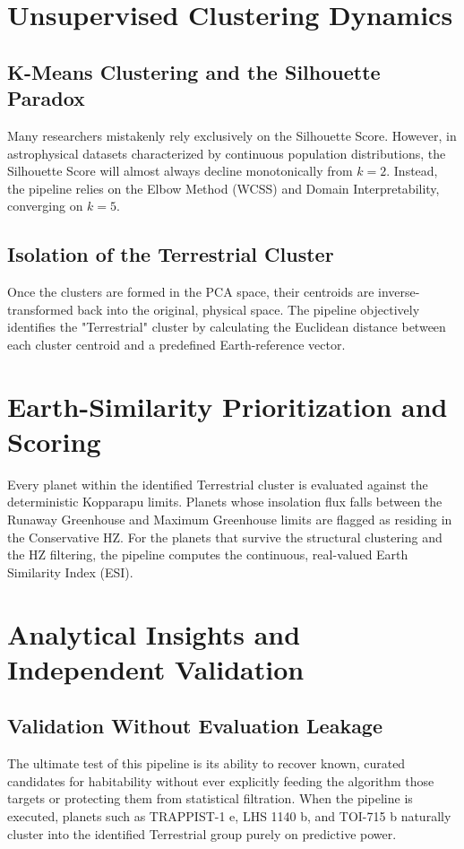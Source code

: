 \section{Unsupervised Clustering Dynamics}
\subsection{K-Means Clustering and the Silhouette Paradox}
Many researchers mistakenly rely exclusively on the Silhouette Score. However, in astrophysical datasets characterized by continuous population distributions, the Silhouette Score will almost always decline monotonically from $k=2$. Instead, the pipeline relies on the Elbow Method (WCSS) and Domain Interpretability, converging on $k=5$.

\subsection{Isolation of the Terrestrial Cluster}
Once the clusters are formed in the PCA space, their centroids are inverse-transformed back into the original, physical space. The pipeline objectively identifies the "Terrestrial" cluster by calculating the Euclidean distance between each cluster centroid and a predefined Earth-reference vector.

\section{Earth-Similarity Prioritization and Scoring}
Every planet within the identified Terrestrial cluster is evaluated against the deterministic Kopparapu limits. Planets whose insolation flux falls between the Runaway Greenhouse and Maximum Greenhouse limits are flagged as residing in the Conservative HZ. For the planets that survive the structural clustering and the HZ filtering, the pipeline computes the continuous, real-valued Earth Similarity Index (ESI).

\section{Analytical Insights and Independent Validation}
\subsection{Validation Without Evaluation Leakage}
The ultimate test of this pipeline is its ability to recover known, curated candidates for habitability without ever explicitly feeding the algorithm those targets or protecting them from statistical filtration. When the pipeline is executed, planets such as TRAPPIST-1 e, LHS 1140 b, and TOI-715 b naturally cluster into the identified Terrestrial group purely on predictive power.

